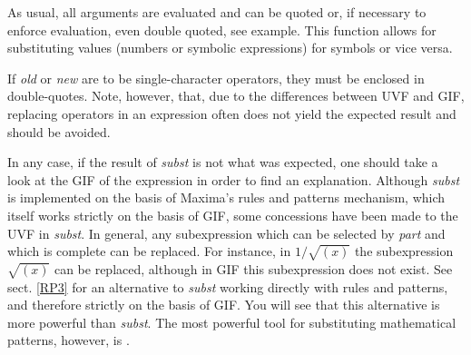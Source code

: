 \documentclass[../Maxima_Workbook.tex]{subfiles}
\begin{document}
\lz As usual, all arguments are evaluated and can be quoted or, if necessary to enforce evaluation, even double quoted, see example. This function allows for substituting values (numbers or symbolic expressions) for symbols or vice versa.

\lz If \emph{old} or \emph{new} are to be single-character operators, they must be enclosed in double-quotes. Note, however, that, due to the differences between UVF and GIF, replacing operators in an expression often does not yield the expected result and should be avoided. 

\lz In any case, if the result of \emph{subst} is not what was expected, one should take a look at the GIF of the expression in order to find an explanation. Although \emph{subst} is implemented on the basis of Maxima's rules and patterns mechanism, which itself works strictly on the basis of GIF, some concessions have been made to the UVF in \emph{subst}. In general, any subexpression which can be selected by \emph{part} and which is complete can be replaced. For instance, in $ 1/\sqrt{(x)} $ the subexpression $ \sqrt{(x)} $ can be replaced, although in GIF this subexpression does not exist. See sect. \ref{RP3} for an alternative to \emph{subst} working directly with rules and patterns, and therefore strictly on the basis of GIF. You will see that this alternative is more powerful than \emph{subst}. The most powerful tool for substituting mathematical patterns, however, is .
\end{document}
